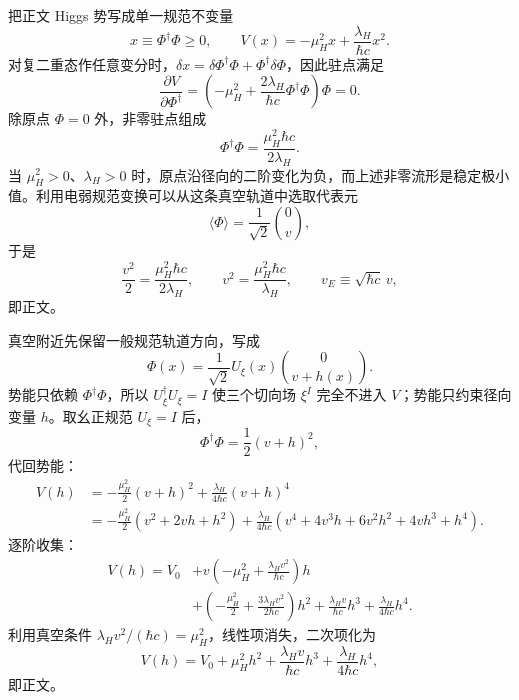\begin{derivation}
把正文 Higgs 势写成单一规范不变量
\begin{equation*}
 x\equiv\Phi^\dagger\Phi\ge0,
 \qquad
 V(x)=-\mu_H^2x+\frac{\lambda_H}{\hbar c}x^2.
\end{equation*}
对复二重态作任意变分时，$\delta x=\delta\Phi^\dagger\Phi+\Phi^\dagger\delta\Phi$，因此驻点满足
\begin{equation*}
 \frac{\partial V}{\partial\Phi^\dagger}
 =\left(-\mu_H^2+\frac{2\lambda_H}{\hbar c}\Phi^\dagger\Phi\right)\Phi=0.
\end{equation*}
除原点 $\Phi=0$ 外，非零驻点组成
\begin{equation*}
 \Phi^\dagger\Phi
 =\frac{\mu_H^2\hbar c}{2\lambda_H}.
\end{equation*}
当 $\mu_H^2>0$、$\lambda_H>0$ 时，原点沿径向的二阶变化为负，而上述非零流形是稳定极小值。利用电弱规范变换可以从这条真空轨道中选取代表元
\begin{equation*}
 \langle\Phi\rangle
 =\frac1{\sqrt2}\binom0v,
\end{equation*}
于是
\begin{equation*}
 \frac{v^2}{2}
 =\frac{\mu_H^2\hbar c}{2\lambda_H},
 \qquad
 v^2=\frac{\mu_H^2\hbar c}{\lambda_H},
 \qquad
 v_E\equiv\sqrt{\hbar c}\,v,
\end{equation*}
即正文。

真空附近先保留一般规范轨道方向，写成
\begin{equation*}
 \Phi(x)=\frac1{\sqrt2}U_\xi(x)\binom0{v+h(x)}.
\end{equation*}
势能只依赖 $\Phi^\dagger\Phi$，所以 $U_\xi^\dagger U_\xi=I$ 使三个切向场 $\xi^I$ 完全不进入 $V$；势能只约束径向变量 $h$。取幺正规范 $U_\xi=I$ 后，
\begin{equation*}
 \Phi^\dagger\Phi=\frac12(v+h)^2,
\end{equation*}
代回势能：
\begin{align*}
 V(h)
 &=-\frac{\mu_H^2}{2}(v+h)^2
 +\frac{\lambda_H}{4\hbar c}(v+h)^4\\
 &=-\frac{\mu_H^2}{2}
 (v^2+2vh+h^2)
 +\frac{\lambda_H}{4\hbar c}
 (v^4+4v^3h+6v^2h^2+4vh^3+h^4).
\end{align*}
逐阶收集：
\begin{align*}
 V(h)=V_0
 &+v\left(-\mu_H^2+\frac{\lambda_Hv^2}{\hbar c}\right)h\\
 &+\left(-\frac{\mu_H^2}{2}+\frac{3\lambda_Hv^2}{2\hbar c}\right)h^2
 +\frac{\lambda_Hv}{\hbar c}h^3
 +\frac{\lambda_H}{4\hbar c}h^4.
\end{align*}
利用真空条件 $\lambda_Hv^2/(\hbar c)=\mu_H^2$，线性项消失，二次项化为
\begin{equation*}
 V(h)=V_0+\mu_H^2h^2
 +\frac{\lambda_Hv}{\hbar c}h^3
 +\frac{\lambda_H}{4\hbar c}h^4,
\end{equation*}
即正文。


\end{derivation}
